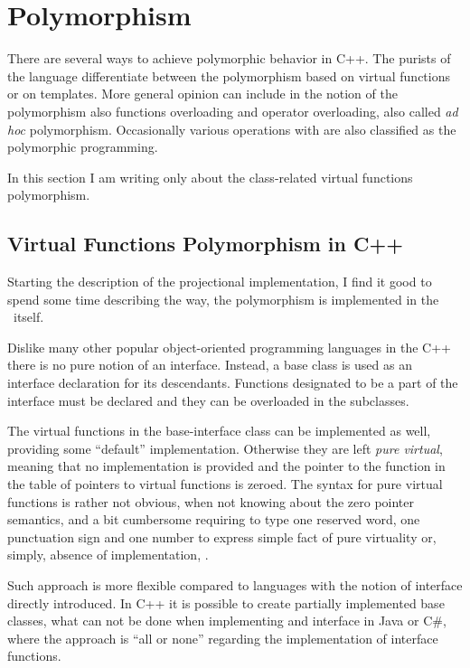 \section{Polymorphism}

There are several ways to achieve polymorphic behavior in C++. The purists of the language differentiate 
between the polymorphism based on virtual functions or on templates. More general opinion can include
in the notion of the polymorphism also functions overloading and operator overloading, also called 
\emph{ad hoc} polymorphism. Occasionally various operations with  are also classified as 
the polymorphic programming.

In this section I am writing only about the class-related virtual functions polymorphism.

\subsection{Virtual Functions Polymorphism in C++}
\label{cpppolydefs}

Starting the description of the projectional implementation, I find it good to spend some time describing
the way, the polymorphism is implemented in the \cpppl\ itself.

Dislike many other popular object-oriented programming languages in the C++ there is no pure notion of
an interface. Instead, a base class is used as an interface declaration for its descendants. Functions
designated to be a part of the interface must be declared  and they can be overloaded in
the subclasses.

The virtual functions in the base-interface class can be implemented as well, providing some ``default''
implementation. Otherwise they are left \emph{pure virtual}, meaning that no implementation is provided
and the pointer to the function in the table of pointers to virtual functions is zeroed. The syntax
for pure virtual functions is rather not obvious, when not knowing about the zero pointer semantics,
and a bit cumbersome requiring to type one reserved word, one punctuation sign and one number to 
express simple fact of pure virtuality or, simply, absence of implementation, .


Such approach is more flexible compared to languages with the notion of interface directly introduced.
In C++ it is possible to create partially implemented base classes, what can not be done when implementing
and interface in Java or C\#, where the approach is ``all or none'' regarding the implementation of interface
functions.


